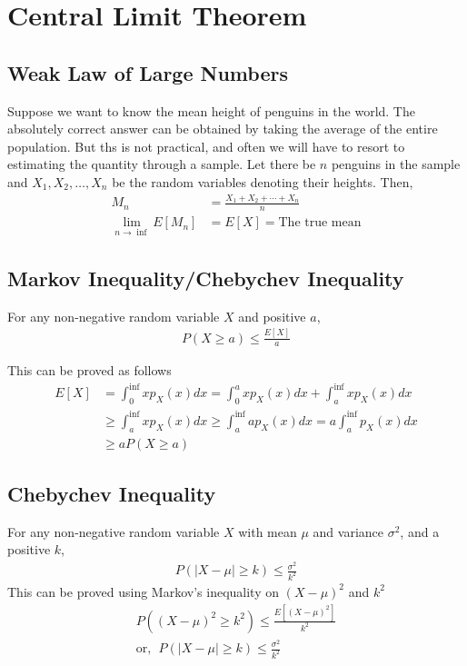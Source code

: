 \documentclass[../probability-notes.tex]{subfiles}
\begin{document}
    \chapter{Central Limit Theorem}
    \section{Weak Law of Large Numbers}
    Suppose we want to know the mean height of penguins in the world. The absolutely correct answer can be obtained by taking the average of the entire population. But ths is not practical, and often we will have to resort to estimating the quantity through a sample. Let there be $n$ penguins in the sample and $X_{1}, X_{2}, \ldots, X_{n}$ be the random variables denoting their heights. Then,
    \begin{align*}
        M_{n} &= \frac{X_{1} + X_{2} + \cdots + X_{n}}{n}\\
        \lim_{n \to \inf} E[M_{n}] &= E[X] = \text{The true mean}
    \end{align*}

    \section{Markov Inequality/Chebychev Inequality}
    For any non-negative random variable $X$ and positive $a$,
    \begin{align*}
        P(X \geq a) \leq \frac{E[X]}{a}
    \end{align*}

    This can be proved as follows
    \begin{align*}
        E[X] &= \int_{0}^{\inf} xp_{X}(x) dx = \int_{0}^{a} xp_{X}(x) dx + \int_{a}^{\inf} xp_{X}(x) dx\\
        &\geq \int_{a}^{\inf} xp_{X}(x) dx \geq \int_{a}^{\inf} ap_{X}(x) dx = a\int_{a}^{\inf} p_{X}(x) dx\\
        &\geq aP(X \geq a)
    \end{align*}

    \section{Chebychev Inequality}
    For any non-negative random variable $X$ with mean $\mu$ and variance $\sigma^{2}$, and a positive $k$,
    \begin{align*}
        P(\lvert X - \mu \rvert \geq k) \leq \frac{\sigma^{2}}{k^{2}}
    \end{align*}
    This can be proved using Markov's inequality on $(X-\mu)^{2}$ and $k^{2}$
    \begin{align*}
        P((X-\mu)^{2} \geq k^{2}) \leq \frac{E[(X-\mu)^{2}]}{k^{2}}\\
        \text{or, } \; P(\lvert X - \mu \rvert \geq k) \leq \frac{\sigma^{2}}{k^{2}}
    \end{align*}
\end{document}
